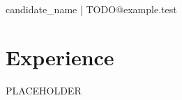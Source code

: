 \documentclass{article}
\begin{document}
{{candidate_name}} | TODO@example.test
\section*{Experience}
PLACEHOLDER
\end{document}
